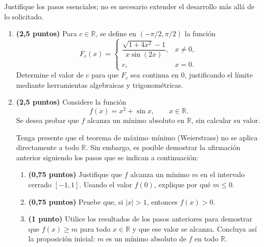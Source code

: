 \documentclass[10pt,a5paper]{article}
\begin{document}
\smallskip
\noindent Justifique los pasos esenciales; no es necesario extender el desarrollo más allá de lo solicitado.
\begin{enumerate}[resume]
  \item \textbf{(2,5 puntos)} Para $c\in\mathbb{R}$, se define en $(-\pi/2,\pi/2)$ la función
  \[
    F_c(x)=\begin{cases}
      \dfrac{\sqrt{1+4x^2}-1}{x\sin(2x)},&x\neq0,\\[2mm]
      c,&x=0.
    \end{cases}
  \]
  Determine el valor de $c$ para que $F_c$ sea continua en $0$, justificando el límite mediante herramientas algebraicas y trigonométricas.

  \item \textbf{(2,5 puntos)} Considere la función
  \[
    f(x)=x^2+\sin x,\qquad x\in\mathbb{R}.
  \]
  Se desea probar que $f$ alcanza un mínimo absoluto en $\mathbb{R}$, sin calcular su valor.
  
  Tenga presente que el teorema de máximo--mínimo (Weierstrass) no se aplica directamente a todo $\mathbb{R}$. Sin embargo, es posible demostrar la afirmación anterior siguiendo los pasos que se indican a continuación:
  \begin{enumerate}
    \item \textbf{(0,75 puntos)} Justifique que $f$ alcanza un mínimo $m$ en el intervalo cerrado $[-1,1]$. Usando el valor $f(0)$, explique por qué $m\leq0$.
    \item \textbf{(0,75 puntos)} Pruebe que, si $|x|>1$, entonces $f(x)>0$.
    \item \textbf{(1 punto)} Utilice los resultados de los pasos anteriores para demostrar que $f(x)\geq m$ para todo $x\in\mathbb{R}$ y que ese valor se alcanza. Concluya así la proposición inicial: $m$ es un mínimo absoluto de $f$ en todo $\mathbb{R}$.
  \end{enumerate}
\end{enumerate}
\end{document}
